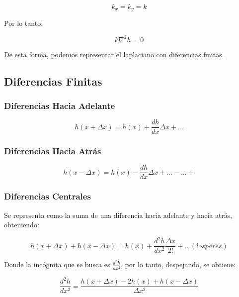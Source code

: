 \begin{equation}
    k_x = k_y = k
\end{equation}

Por lo tanto:

\begin{equation}
    k \nabla^2 h = 0
\end{equation}

De esta forma, podemos representar el laplaciano con diferencias finitas.

\subsection{Diferencias Finitas}

\subsubsection{Diferencias Hacia Adelante}

\begin{equation}
    h(x + \Delta x) = h(x) + \frac{dh}{dx} \Delta x + ...
\end{equation}

\subsubsection{Diferencias Hacia Atrás}

\begin{equation}
    h(x - \Delta x) = h(x) - \frac{dh}{dx} \Delta x + ...-...+
\end{equation}

\subsubsection{Diferencias Centrales}

Se representa como la suma de una diferencia hacia adelante y hacia atrás, obteniendo:

\begin{equation}
    h(x + \Delta x) + h(x - \Delta x) = h(x) + \frac{d^2h}{dx^2}\frac{\Delta x}{2!} + ...(los pares)
\end{equation}

Donde la incógnita que se busca es $\frac{d^2h}{dx^2}$, por lo tanto, despejando, se obtiene:

\begin{equation}
    \frac{d^2h}{dx^2} = \frac{h(x + \Delta x) - 2h(x) + h(x - \Delta x)}{\Delta x^2}
\end{equation}

